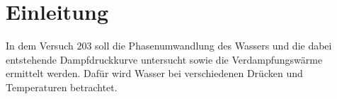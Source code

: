 \section{Einleitung}
  In dem Versuch $203$ soll die Phasenumwandlung des Wassers und die dabei entstehende Dampfdruckkurve untersucht sowie die Verdampfungswärme ermittelt werden.
  Dafür wird Wasser bei verschiedenen Drücken und Temperaturen betrachtet.
\label{sec:Einleitung}
